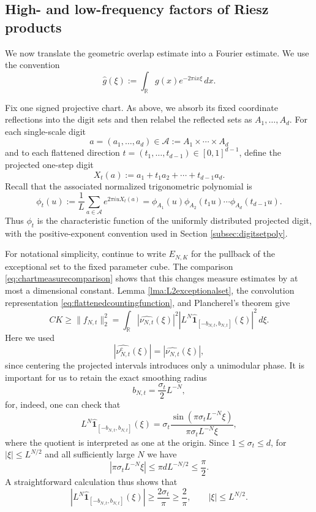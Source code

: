 \documentclass[12pt]{amsart}
\numberwithin{equation}{section}
\begin{document}
\subsection{High- and low-frequency factors of Riesz products}
\label{subsec:countingandtrig}

We now translate the geometric overlap estimate into a Fourier estimate. We use the convention
\[
\widehat{g}(\xi):=\int_{\mathbb R}g(x)e^{-2\pi ix\xi}\,dx.
\]

Fix one signed projective chart. As above, we absorb its fixed coordinate reflections into the digit sets and then relabel the reflected sets as $A_1,\ldots,A_d$. For each single-scale digit
\[
a=(a_1,\ldots,a_d)\in\mathcal A
:=A_1\times\cdots\times A_d
\]
and to each flattened direction $t=(t_1,\ldots,t_{d-1})\in[0,1]^{d-1}$, define the projected one-step digit
\[
X_t(a):=a_1+t_1a_2+\cdots+t_{d-1}a_d.
\]
Recall that the associated normalized trigonometric polynomial is
\begin{equation}\label{eq:phit-probabilistic}
\phi_t(u)
:=\frac1L\sum_{a\in\mathcal A}e^{2\pi iuX_t(a)}
=\phi_{A_1}(u)\phi_{A_2}(t_1u)\cdots
 \phi_{A_d}(t_{d-1}u).
\end{equation}
Thus $\phi_t$ is the characteristic function of the uniformly distributed projected digit, with the positive-exponent convention used in Section \ref{subsec:digitsetpoly}.

For notational simplicity, continue to write $E_{N,K}$ for the pullback of the exceptional set to the fixed parameter cube. The comparison \eqref{eq:chartmeasurecomparison} shows that this changes measure estimates by at most a dimensional constant. Lemma \ref{lma:L2exceptionalset}, the convolution representation \eqref{eq:flattenedcountingfunction}, and Plancherel's theorem give
\begin{equation}\label{eq:exactplancherelcounting}
CK\geq\|f_{N,t}\|_2^2
=\int_{\mathbb R}
 \left|\widehat{\nu_{N,t}}(\xi)\right|^2
 \left|
 L^N\widehat{\mathbf 1}_{[-b_{N,t},b_{N,t}]}(\xi)
 \right|^2\,d\xi.
\end{equation}
Here we used
\[
\left|\widehat{\nu_{N,t}^{\mathrm c}}(\xi)\right|
=\left|\widehat{\nu_{N,t}}(\xi)\right|,
\]
since centering the projected intervals introduces only a unimodular phase. It is important for us to retain the exact smoothing radius
\[
b_{N,t}=\frac{\sigma_t}{2}L^{-N},
\]
for, indeed, one can check that
\begin{equation}\label{eq:exactsmoothingmultiplier}
L^N\widehat{\mathbf 1}_{[-b_{N,t},b_{N,t}]}(\xi)
=\sigma_t
 \frac{\sin(\pi\sigma_tL^{-N}\xi)}
 {\pi\sigma_tL^{-N}\xi},
\end{equation}
where the quotient is interpreted as one at the origin. Since
$1\leq\sigma_t\leq d$,
for $|\xi|\leq L^{N/2}$ and all sufficiently large $N$ we have
\[
|\pi\sigma_tL^{-N}\xi|
\leq\pi dL^{-N/2}\leq\frac{\pi}{2}.
\]
A straightforward calculation thus shows that
\begin{equation}\label{eq:smoothingmultiplierlower}
\left|
L^N\widehat{\mathbf 1}_{[-b_{N,t},b_{N,t}]}(\xi)
\right|
\geq\frac{2\sigma_t}{\pi}
\geq\frac2\pi,
\qquad |\xi|\leq L^{N/2}.
\end{equation}
\end{document}
